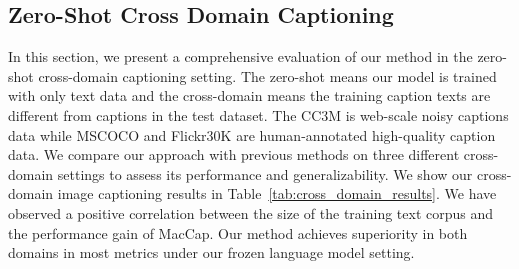 





\subsection{Zero-Shot Cross Domain Captioning}

In this section, we present a comprehensive evaluation of our method in the zero-shot cross-domain captioning setting. The zero-shot means our model is trained with only text data and the cross-domain means the training caption texts are different from captions in the test dataset. The CC3M is web-scale noisy captions data while MSCOCO and Flickr30K are human-annotated high-quality caption data. 
We compare our approach with previous methods on three different cross-domain settings to assess its performance and generalizability. We show our cross-domain image captioning results in Table~\ref{tab:cross_domain_results}. We have observed a positive correlation between the size of the training text corpus and the performance gain of MacCap. Our method achieves superiority in both domains in most metrics under our frozen language model setting. 



